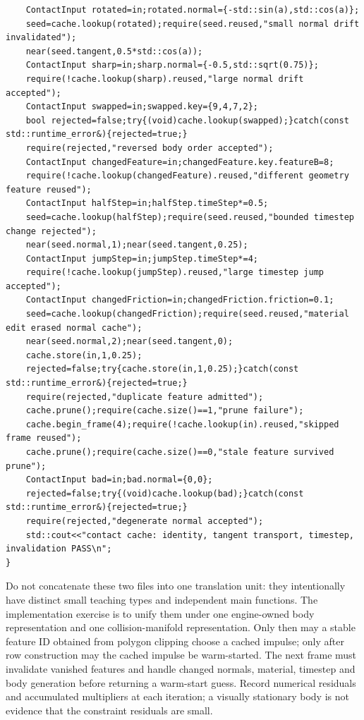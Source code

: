\begin{verbatim}
    ContactInput rotated=in;rotated.normal={-std::sin(a),std::cos(a)};
    seed=cache.lookup(rotated);require(seed.reused,"small normal drift invalidated");
    near(seed.tangent,0.5*std::cos(a));
    ContactInput sharp=in;sharp.normal={-0.5,std::sqrt(0.75)};
    require(!cache.lookup(sharp).reused,"large normal drift accepted");
    ContactInput swapped=in;swapped.key={9,4,7,2};
    bool rejected=false;try{(void)cache.lookup(swapped);}catch(const std::runtime_error&){rejected=true;}
    require(rejected,"reversed body order accepted");
    ContactInput changedFeature=in;changedFeature.key.featureB=8;
    require(!cache.lookup(changedFeature).reused,"different geometry feature reused");
    ContactInput halfStep=in;halfStep.timeStep*=0.5;
    seed=cache.lookup(halfStep);require(seed.reused,"bounded timestep change rejected");
    near(seed.normal,1);near(seed.tangent,0.25);
    ContactInput jumpStep=in;jumpStep.timeStep*=4;
    require(!cache.lookup(jumpStep).reused,"large timestep jump accepted");
    ContactInput changedFriction=in;changedFriction.friction=0.1;
    seed=cache.lookup(changedFriction);require(seed.reused,"material edit erased normal cache");
    near(seed.normal,2);near(seed.tangent,0);
    cache.store(in,1,0.25);
    rejected=false;try{cache.store(in,1,0.25);}catch(const std::runtime_error&){rejected=true;}
    require(rejected,"duplicate feature admitted");
    cache.prune();require(cache.size()==1,"prune failure");
    cache.begin_frame(4);require(!cache.lookup(in).reused,"skipped frame reused");
    cache.prune();require(cache.size()==0,"stale feature survived prune");
    ContactInput bad=in;bad.normal={0,0};
    rejected=false;try{(void)cache.lookup(bad);}catch(const std::runtime_error&){rejected=true;}
    require(rejected,"degenerate normal accepted");
    std::cout<<"contact cache: identity, tangent transport, timestep, invalidation PASS\n";
}
\end{verbatim}

Do not concatenate these two files into one translation unit: they intentionally have distinct small teaching types and independent main functions. The implementation exercise is to unify them under one engine-owned body representation and one collision-manifold representation. Only then may a stable feature ID obtained from polygon clipping choose a cached impulse; only after row construction may the cached impulse be warm-started. The next frame must invalidate vanished features and handle changed normals, material, timestep and body generation before returning a warm-start guess. Record numerical residuals and accumulated multipliers at each iteration; a visually stationary body is not evidence that the constraint residuals are small.

